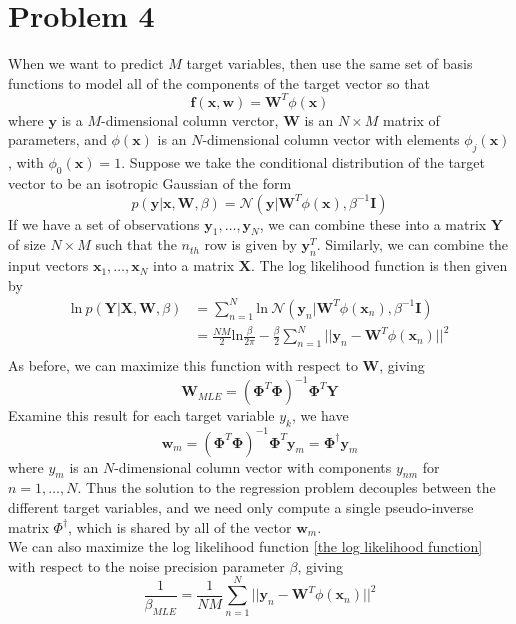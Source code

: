 \documentclass{article}
\begin{document}
\section*{Problem 4}
When we want to predict $M$ target variables, then use the same set of basis functions to model all of the components of the target vector so that
\begin{equation}
\bm{f}(\bm{x}, \bm{w}) = \bm{W}^T\phi(\bm{x})
\end{equation}
where $\bm{y}$ is a $M$-dimensional column verctor, $\bm{W}$ is an $N\times M$ matrix of parameters, and $\phi(\bm{x})$ is an $N$-dimensional column vector with elements $\phi_j(\bm{x})$, with $\phi_0(\bm{x}) = 1$. Suppose we take the conditional distribution of the target vector to be an isotropic Gaussian of the form
\begin{equation}
p(\bm{y}|\bm{x}, \bm{W}, \beta) = \mathcal{N}(\bm{y}|\bm{W}^T\phi(\bm{x}), \beta^{-1}\bm{I})
\end{equation}
If we have a set of observations $\bm{y}_1, \dots, \bm{y}_N$, we can combine these into a matrix $\bm{Y}$ of size $N\times M$ such that the $n_{th}$ row is given by $\bm{y}_n^T$. Similarly, we can combine the input vectors $\bm{x}_1, \dots, \bm{x}_N$ into a matrix $\bm{X}$. The log likelihood function is then given by
\begin{equation}
\begin{aligned}
\mathrm{ln}\ p(\bm{Y}|\bm{X}, \bm{W}, \beta) 
&= \sum_{n=1}^{N}\mathrm{ln}\ \mathcal{N}(\bm{y}_n|\bm{W}^T\phi(\bm{x}_n), \beta^{-1}\bm{I})\\
&= \frac{NM}{2}\mathrm{ln}{\frac{\beta}{2\pi}} - \frac{\beta}{2}\sum_{n=1}^{N}||\bm{y}_n-\bm{W}^T\phi(\bm{x}_n)||^2\\
\label{the log likelihood function}
\end{aligned}
\end{equation}
As before, we can maximize this function with respect to $\bm{W}$, giving
\begin{equation}
\bm{W}_{MLE} = (\bm{\Phi}^T\bm{\Phi})^{-1}\bm{\Phi}^T\bm{Y}
\end{equation}
Examine this result for each target variable $y_k$, we have
\begin{equation}
\bm{w}_m = (\bm{\Phi}^T\bm{\Phi})^{-1}\bm{\Phi}^T\bm{y}_m = \bm{\Phi}^\dagger\bm{y}_m
\end{equation}
where $y_m$ is an $N$-dimensional column vector with components $y_{nm}$ for $n=1, \dots, N$. Thus the solution to the regression problem decouples between the different target variables, and we need only compute a single pseudo-inverse matrix $\Phi^\dagger$, which is shared by all of the vector $\bm{w}_m$.\\
We can also maximize the log likelihood function \ref{the log likelihood function} with respect to the noise precision parameter $\beta$, giving
\begin{equation}
\frac{1}{\beta_{MLE}} = \frac{1}{NM}\sum_{n=1}^{N}||\bm{y}_n - \bm{W}^T\phi(\bm{x}_n)||^2
\end{equation}
 
\end{document}
